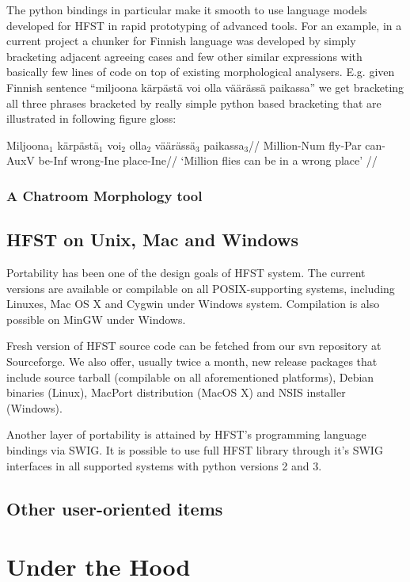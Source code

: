 \documentclass{llncs}
\begin{document}
The python bindings in particular make it smooth to use language models
developed for HFST in rapid prototyping of advanced tools. For an example, in
a current project a chunker for Finnish language was developed by simply
bracketing adjacent agreeing cases and few other similar expressions with
basically few lines of code on top of existing morphological analysers. E.g.
given Finnish sentence ``miljoona kärpästä voi olla väärässä paikassa'' we get
bracketing all three phrases bracketed by really simple python based bracketing
that are illustrated in following figure gloss:

\ex
\begingl
\gla Miljoona$_1$ kärpästä$_1$ voi$_2$ olla$_2$ väärässä$_3$ paikassa$_3$//
\glb Million-{\sc Num} fly-{\sc Par} can-{\sc AuxV} be-{\sc Inf} wrong-{\sc Ine} place-{\sc Ine}//
\glft `Million flies can be in a wrong place' //
\endgl
\xe


\subsubsection{A Chatroom Morphology tool}

\subsection{HFST on Unix, Mac and Windows}

Portability has been one of the design goals of HFST system. The current 
versions are available or compilable on all POSIX-supporting systems, including
Linuxes, Mac OS X and Cygwin under Windows system. Compilation is also possible 
on MinGW under Windows. 

Fresh version of HFST source code can be fetched from our svn repository at Sourceforge.
We also offer, usually twice a month, new release packages that include source tarball
(compilable on all aforementioned platforms), Debian binaries (Linux), MacPort 
distribution (MacOS X) and NSIS installer (Windows).

Another layer of portability
is attained by HFST's programming language bindings via SWIG. It is possible to
use full HFST library through it's SWIG interfaces in all supported systems with
python versions 2 and 3.


\subsection{Other user-oriented items}

\section{Under the Hood}
\end{document}
